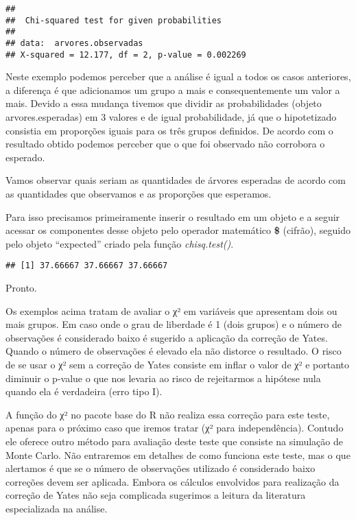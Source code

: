 \documentclass[]{book}
\newenvironment{Shaded}{\begin{snugshade}}{\end{snugshade}}
\newcommand{\DataTypeTok}[1]{\textcolor[rgb]{0.13,0.29,0.53}{#1}}
\newcommand{\KeywordTok}[1]{\textcolor[rgb]{0.13,0.29,0.53}{\textbf{#1}}}
\newcommand{\NormalTok}[1]{#1}
\newcommand{\OperatorTok}[1]{\textcolor[rgb]{0.81,0.36,0.00}{\textbf{#1}}}
\newcommand{\StringTok}[1]{\textcolor[rgb]{0.31,0.60,0.02}{#1}}
\begin{document}
\begin{verbatim}
## 
##  Chi-squared test for given probabilities
## 
## data:  arvores.observadas
## X-squared = 12.177, df = 2, p-value = 0.002269
\end{verbatim}

Neste exemplo podemos perceber que a análise é igual a todos os casos anteriores, a diferença é que adicionamos um grupo a mais e consequentemente um valor a mais. Devido a essa mudança tivemos que dividir as probabilidades (objeto arvores.esperadas) em 3 valores e de igual probabilidade, já que o hipotetizado consistia em proporções iguais para os três grupos definidos. De acordo com o resultado obtido podemos perceber que o que foi observado não corrobora o esperado.

Vamos observar quais seriam as quantidades de árvores esperadas de acordo com as quantidades que observamos e as proporções que esperamos.

Para isso precisamos primeiramente inserir o resultado em um objeto e a seguir acessar os componentes desse objeto pelo operador matemático \textbf{\$} (cifrão), seguido pelo objeto ``expected'' criado pela função \emph{chisq.test()}.

\begin{Shaded}
\end{Shaded}

\begin{verbatim}
## [1] 37.66667 37.66667 37.66667
\end{verbatim}

Pronto.

Os exemplos acima tratam de avaliar o χ² em variáveis que apresentam dois ou mais grupos. Em caso onde o grau de liberdade é 1 (dois grupos) e o número de observações é considerado baixo é sugerido a aplicação da correção de Yates. Quando o número de observações é elevado ela não distorce o resultado. O risco de se usar o χ² sem a correção de Yates consiste em inflar o valor de χ² e portanto diminuir o p-value o que nos levaria ao risco de rejeitarmos a hipótese nula quando ela é verdadeira (erro tipo I).

A função do χ² no pacote base do R não realiza essa correção para este teste, apenas para o próximo caso que iremos tratar (χ² para independência). Contudo ele oferece outro método para avaliação deste teste que consiste na simulação de Monte Carlo. Não entraremos em detalhes de como funciona este teste, mas o que alertamos é que se o número de observações utilizado é considerado baixo correções devem ser aplicada. Embora os cálculos envolvidos para realização da correção de Yates não seja complicada sugerimos a leitura da literatura especializada na análise.
\end{document}

